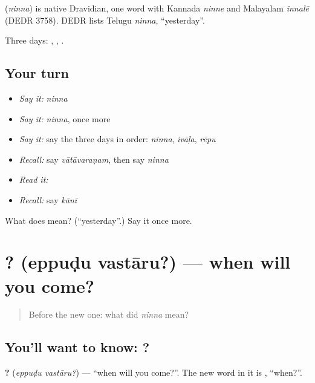 \begin{cousinweb}
\textbf{} (\emph{ninna}) is native Dravidian, one word with Kannada \emph{ninne} and Malayalam \emph{innalē} (DEDR 3758). DEDR lists Telugu \emph{ninna}, \textquotedblleft{}yesterday\textquotedblright{}.
\end{cousinweb}

\begin{grammarlens}[title={What you've built}]
Three days: , , .
\end{grammarlens}

\subsection*{Your turn}
\begin{itemize}
\raggedright
  \item \emph{Say it:} \emph{ninna}
  \item \emph{Say it:} \emph{ninna}, once more
  \item \emph{Say it:} say the three days in order: \emph{ninna}, \emph{ivāḷa}, \emph{rēpu}
  \item \emph{Recall:} say \emph{vātāvaraṇam}, then say \emph{ninna}
  \item \emph{Read it:} \textbf{}
  \item \emph{Recall:} say \emph{kānī}
\end{itemize}

\begin{tcolorbox}[breakable,colback=teal!4,colframe=teal!35!black,title={Before you move on}]
What does  mean? (\textquotedblleft{}yesterday\textquotedblright{}.) Say it once more.
\end{tcolorbox}
\section[\texorpdfstring{\te{ఎప్పుడు} \te{వస్తారు}? (eppuḍu vastāru?)}{ఎప్పుడు వస్తారు? (eppuḍu vastāru?)}]{ ? (eppuḍu vastāru?) — when will you come?}

\label{lesson:TE-C75-when}



\begin{quote}
Before the new one: what did \emph{ninna} mean?
\end{quote}

\subsection*{You'll want to know:  ?}
\textbf{ ?} (\emph{eppuḍu vastāru?}) — \textquotedblleft{}when will you come?\textquotedblright{}. The new word in it is \textbf{}, \textquotedblleft{}when?\textquotedblright{}.

